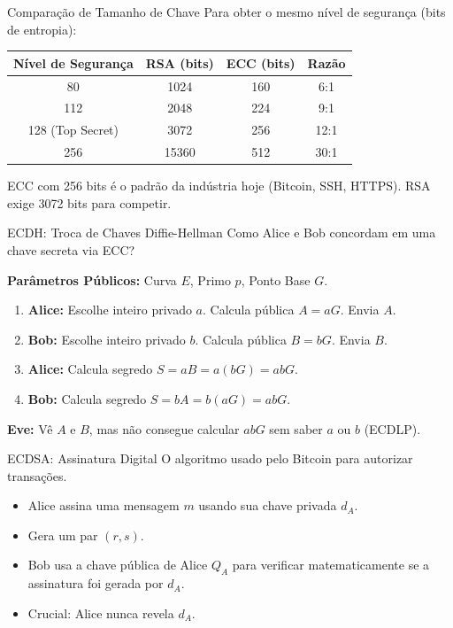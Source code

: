 \documentclass[aspectratio=169]{beamer}
\begin{document}
\begin{frame}{Comparação de Tamanho de Chave}
  Para obter o mesmo nível de segurança (bits de entropia):
  
  \begin{table}[]
  \centering
  \begin{tabular}{|c|c|c|c|}
  \hline
  \textbf{Nível de Segurança} & \textbf{RSA (bits)} & \textbf{ECC (bits)} & \textbf{Razão} \\ \hline
  80  & 1024 & 160 & 6:1 \\ \hline
  112 & 2048 & 224 & 9:1 \\ \hline
  128 (Top Secret) & 3072 & 256 & 12:1 \\ \hline
  256 & 15360 & 512 & 30:1 \\ \hline
  \end{tabular}
  \end{table}
  
  ECC com 256 bits é o padrão da indústria hoje (Bitcoin, SSH, HTTPS). RSA exige 3072 bits para competir.
\end{frame}

\begin{frame}{ECDH: Troca de Chaves Diffie-Hellman}
  Como Alice e Bob concordam em uma chave secreta via ECC?
  
  \textbf{Parâmetros Públicos:} Curva $E$, Primo $p$, Ponto Base $G$.
  
  \begin{enumerate}
      \item \textbf{Alice:} Escolhe inteiro privado $a$. Calcula pública $A = aG$. Envia $A$.
      \item \textbf{Bob:} Escolhe inteiro privado $b$. Calcula pública $B = bG$. Envia $B$.
      \item \textbf{Alice:} Calcula segredo $S = aB = a(bG) = abG$.
      \item \textbf{Bob:} Calcula segredo $S = bA = b(aG) = abG$.
  \end{enumerate}
  
  \textbf{Eve:} Vê $A$ e $B$, mas não consegue calcular $abG$ sem saber $a$ ou $b$ (ECDLP).
\end{frame}

\begin{frame}{ECDSA: Assinatura Digital}
  O algoritmo usado pelo Bitcoin para autorizar transações.
  
  \begin{itemize}
      \item Alice assina uma mensagem $m$ usando sua chave privada $d_A$.
      \item Gera um par $(r, s)$.
      \item Bob usa a chave pública de Alice $Q_A$ para verificar matematicamente se a assinatura foi gerada por $d_A$.
      \item Crucial: Alice nunca revela $d_A$.
  \end{itemize}
\end{frame}
\end{document}

